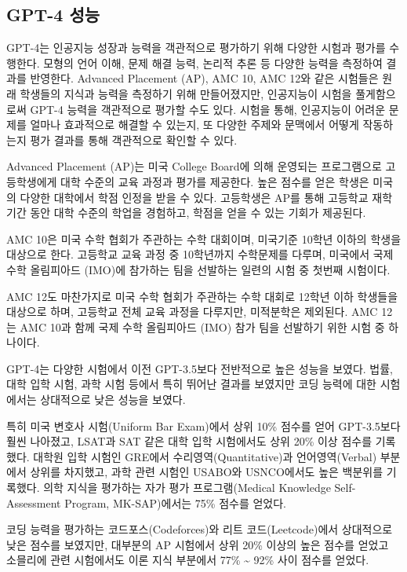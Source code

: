 \documentclass[
  letterpaper,
]{book}
\begin{document}
\hypertarget{gpt-4-uxc131uxb2a5}{%
\subsection{GPT-4 성능}\label{gpt-4-uxc131uxb2a5}}

GPT-4는 인공지능 성장과 능력을 객관적으로 평가하기 위해 다양한 시험과
평가를 수행한다. 모형의 언어 이해, 문제 해결 능력, 논리적 추론 등 다양한
능력을 측정하여 결과를 반영한다. Advanced Placement (AP), AMC 10, AMC
12와 같은 시험들은 원래 학생들의 지식과 능력을 측정하기 위해
만들어졌지만, 인공지능이 시험을 풀게함으로써 GPT-4 능력을 객관적으로
평가할 수도 있다. 시험을 통해, 인공지능이 어려운 문제를 얼마나
효과적으로 해결할 수 있는지, 또 다양한 주제와 문맥에서 어떻게 작동하는지
평가 결과를 통해 객관적으로 확인할 수 있다.

Advanced Placement (AP)는 미국 College Board에 의해 운영되는
프로그램으로 고등학생에게 대학 수준의 교육 과정과 평가를 제공한다. 높은
점수를 얻은 학생은 미국의 다양한 대학에서 학점 인정을 받을 수 있다.
고등학생은 AP를 통해 고등학교 재학기간 동안 대학 수준의 학업을 경험하고,
학점을 얻을 수 있는 기회가 제공된다.

AMC 10은 미국 수학 협회가 주관하는 수학 대회이며, 미국기준 10학년 이하의
학생을 대상으로 한다. 고등학교 교육 과정 중 10학년까지 수학문제를
다루며, 미국에서 국제 수학 올림피아드 (IMO)에 참가하는 팀을 선발하는
일련의 시험 중 첫번째 시험이다.

AMC 12도 마찬가지로 미국 수학 협회가 주관하는 수학 대회로 12학년 이하
학생들을 대상으로 하며, 고등학교 전체 교육 과정을 다루지만, 미적분학은
제외된다. AMC 12는 AMC 10과 함께 국제 수학 올림피아드 (IMO) 참가 팀을
선발하기 위한 시험 중 하나이다.

GPT-4는 다양한 시험에서 이전 GPT-3.5보다 전반적으로 높은 성능을 보였다.
법률, 대학 입학 시험, 과학 시험 등에서 특히 뛰어난 결과를 보였지만 코딩
능력에 대한 시험에서는 상대적으로 낮은 성능을 보였다.

특히 미국 변호사 시험(Uniform Bar Exam)에서 상위 10\% 점수를 얻어
GPT-3.5보다 훨씬 나아졌고, LSAT과 SAT 같은 대학 입학 시험에서도 상위
20\% 이상 점수를 기록했다. 대학원 입학 시험인 GRE에서
수리영역(Quantitative)과 언어영역(Verbal) 부분에서 상위를 차지했고, 과학
관련 시험인 USABO와 USNCO에서도 높은 백분위를 기록했다. 의학 지식을
평가하는 자가 평가 프로그램(Medical Knowledge Self-Assessment Program,
MK-SAP)에서는 75\% 점수를 얻었다.

코딩 능력을 평가하는 코드포스(Codeforces)와 리트 코드(Leetcode)에서
상대적으로 낮은 점수를 보였지만, 대부분의 AP 시험에서 상위 20\% 이상의
높은 점수를 얻었고 소믈리에 관련 시험에서도 이론 지식 부분에서 77\%
\textasciitilde{} 92\% 사이 점수를 얻었다. \autocite{openai2023gpt4}
\end{document}
